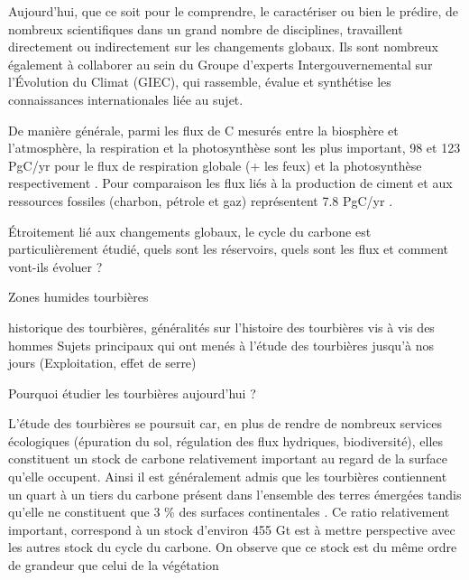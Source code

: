 \begin{linenumbers}
Aujourd'hui, que ce soit pour le comprendre, le caractériser ou bien le prédire, de nombreux  scientifiques dans un grand nombre de disciplines, travaillent directement ou indirectement sur les changements globaux.
Ils sont nombreux également à collaborer au sein du  Groupe d'experts Intergouvernemental sur l'Évolution du Climat (GIEC), qui rassemble, évalue et synthétise les connaissances internationales liée au sujet.

De manière générale, parmi les flux de C mesurés entre la biosphère et l'atmosphère, la respiration et la photosynthèse sont les plus  important, 98 et 123 PgC/yr pour le flux de respiration globale (+ les feux) et la photosynthèse respectivement \cite{Bond-Lamberty2010,Beer2010}. Pour comparaison les flux liés à la production de ciment et aux ressources fossiles (charbon, pétrole et gaz) représentent 7.8 PgC/yr \cite{Ciais2014}.

Étroitement lié aux changements globaux, le cycle du carbone est particulièrement étudié, quels sont les réservoirs, quels sont les flux et comment vont-ils évoluer ? 


Zones humides tourbières

historique des tourbières, généralités sur l'histoire des tourbières vis à vis des hommes
Sujets principaux qui ont menés à l’étude des tourbières jusqu'à nos jours (Exploitation, effet de serre)

Pourquoi étudier les tourbières aujourd’hui ? 





L'étude des tourbières se poursuit car, en plus de rendre de nombreux services écologiques  (épuration du sol, régulation des flux hydriques, biodiversité), elles constituent un stock de carbone relativement important au regard de la surface qu'elle occupent. Ainsi il est généralement admis que les tourbières contiennent un quart à un tiers du carbone présent  dans l'ensemble des terres émergées tandis qu'elle ne constituent que 3 \% des surfaces continentales \plop. Ce ratio relativement important, correspond à un stock d'environ 455 Gt \cite{gorham1991,turunen2002} est à mettre perspective avec les autres stock du cycle du carbone. On observe que ce stock est du même ordre de grandeur que celui de la végétation 


\end{linenumbers}
